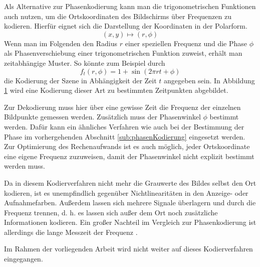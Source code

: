 Als Alternative zur Phasenkodierung kann man die trigonometrischen Funktionen auch nutzen, um die Ortskoordinaten des Bildschirms über Frequenzen zu kodieren.
Hierfür eignet sich die Darstellung der Koordinaten in der Polarform.
%
\begin{equation*}
	\left(x,y\right) \mapsto \left(r,\phi\right)
\end{equation*}
%
Wenn man im Folgenden den Radius $r$ einer speziellen Frequenz und die Phase $\phi$ als Phasenverschiebung einer trigonometrischen Funktion zuweist, erhält man zeitabhängige Muster.
So könnte zum Beispiel durch
%
\begin{equation*}
	f_t \left(r,\phi\right) = 1 + \sin \left(2 \pi r t + \phi \right)
\end{equation*}
%
die Kodierung der Szene in Abhängigkeit der Zeit $t$ angegeben sein.
In Abbildung \ref{tikz:abbFrequenzkodierteMuster} wird eine Kodierung dieser Art zu bestimmten Zeitpunkten abgebildet.
%
\begin{figure}[H]
	\centering
	
	\label{tikz:abbFrequenzkodierteMuster}
\end{figure}
%
\noindent
Zur Dekodierung muss hier über eine gewisse Zeit die Frequenz der einzelnen Bildpunkte gemessen werden.
Zusätzlich muss der Phasenwinkel $\phi$ bestimmt werden.
Dafür kann ein ähnliches Verfahren wie auch bei der Bestimmung der Phase im vorhergehenden Abschnitt \ref{sub:phasenKodierung} eingesetzt werden.
Zur Optimierung des Rechenaufwands ist es auch möglich, jeder Ortskoordinate eine eigene Frequenz zuzuweisen, damit der Phasenwinkel nicht explizit bestimmt werden muss.

\p
Da in diesem Kodierverfahren nicht mehr die Grauwerte des Bildes selbst den Ort kodieren, ist es unempfindlich gegenüber Nichtlinearitäten in den Anzeige- oder Aufnahmefarben.
Außerdem lassen sich mehrere Signale überlagern und durch die Frequenz trennen, d. h. es lassen sich außer dem Ort noch zusätzliche Informationen kodieren.
Ein großer Nachteil im Vergleich zur Phasenkodierung ist allerdings die lange Messzeit der Frequenz \cite{jenaerOK}.

\p
Im Rahmen der vorliegenden Arbeit wird nicht weiter auf dieses Kodierverfahren eingegangen.